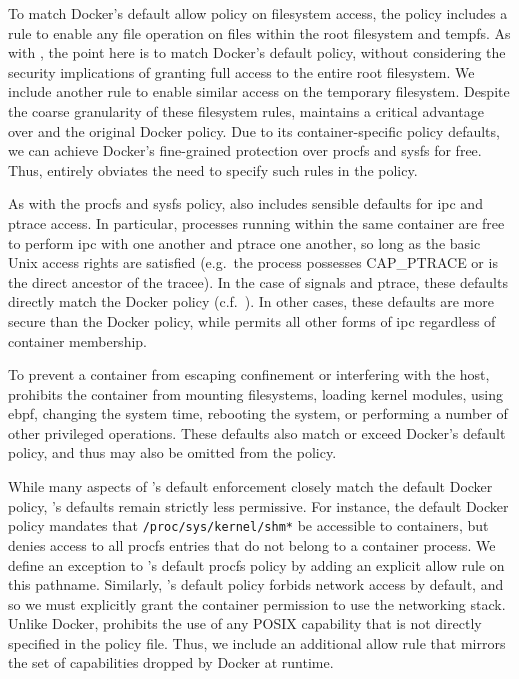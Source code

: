 To match Docker's default allow policy on filesystem access, the \bpfcontain{} policy
includes a rule to enable any file operation on files within the root filesystem and
tempfs.  As with \bpfbox{}, the point here is to match Docker's default policy, without
considering the security implications of granting full access to the entire root
filesystem. We include another rule to enable similar access on the temporary filesystem.
Despite the coarse granularity of these filesystem rules, \bpfcontain{} maintains
a critical advantage over \bpfbox{} and the original Docker policy. Due to its
container-specific policy defaults, we can achieve Docker's fine-grained protection over
procfs and sysfs for free. Thus, \bpfcontain{} entirely obviates the need to specify such
rules in the policy.

As with the procfs and sysfs policy, \bpfcontain{} also includes sensible defaults for
\gls{ipc} and ptrace access. In particular, processes running within the same container
are free to perform \gls{ipc} with one another and ptrace one another, so long as the
basic Unix access rights are satisfied (e.g.\ the process possesses CAP\_PTRACE or is the
direct ancestor of the tracee). In the case of signals and ptrace, these defaults directly
match the Docker policy (c.f.\ ).  In other cases, these defaults
are more secure than the Docker policy, while permits all other forms of \gls{ipc}
regardless of container membership.

To prevent a container from escaping confinement or interfering with the host,
\bpfcontain{} prohibits the container from mounting filesystems, loading kernel modules,
using \gls{ebpf}, changing the system time, rebooting the system, or performing a number
of other privileged operations. These defaults also match or exceed Docker's default
policy, and thus may also be omitted from the \bpfcontain{} policy.

While many aspects of \bpfcontain{}'s default enforcement closely match the default Docker
policy, \bpfcontain{}'s defaults remain strictly less permissive. For instance, the
default Docker policy mandates that \texttt{/proc/sys/kernel/shm*} be accessible to
containers, but \bpfcontain{} denies access to all procfs entries that do not belong to
a container process. We define an exception to \bpfcontain{}'s default procfs policy by
adding an explicit allow rule on this pathname. Similarly, \bpfcontain{}'s default policy
forbids network access by default, and so we must explicitly grant the container
permission to use the networking stack. Unlike Docker, \bpfcontain{} prohibits the use of
any POSIX capability that is not directly specified in the policy file. Thus, we include
an additional allow rule that mirrors the set of capabilities dropped by Docker at
runtime.

